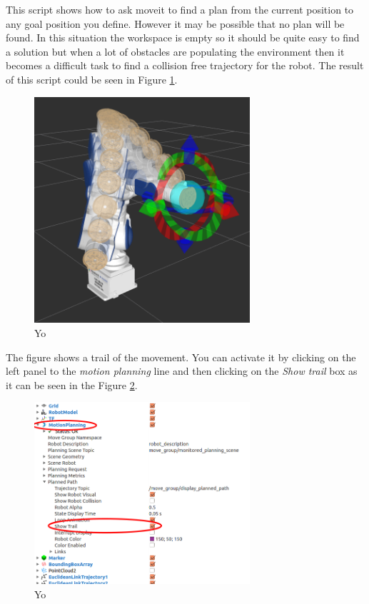 This script shows how to ask moveit to find a plan from the current position to any goal position you define. However it may be possible that no plan will be found. In this situation the workspace is empty so it should be quite easy to find a solution but when a lot of obstacles are populating the environment then it becomes a difficult task to find a collision free trajectory for the robot. The result of this script could be seen in Figure \ref{fig:simple_moving}.

\begin{figure}
\includegraphics[width=8cm]{images/utilisation/simple_moving.png}
\centering
\caption{Yo}
\label{fig:simple_moving}
\end{figure}

The figure shows a trail of the movement. You can activate it by clicking on the left panel to the \emph{motion planning} line and then clicking on the \emph{Show trail} box as it can be seen in the Figure \ref{fig:show_trail}.  


\begin{figure}
\includegraphics[width=8cm]{images/utilisation/show_trail.png}
\centering
\caption{Yo}
\label{fig:show_trail}
\end{figure}